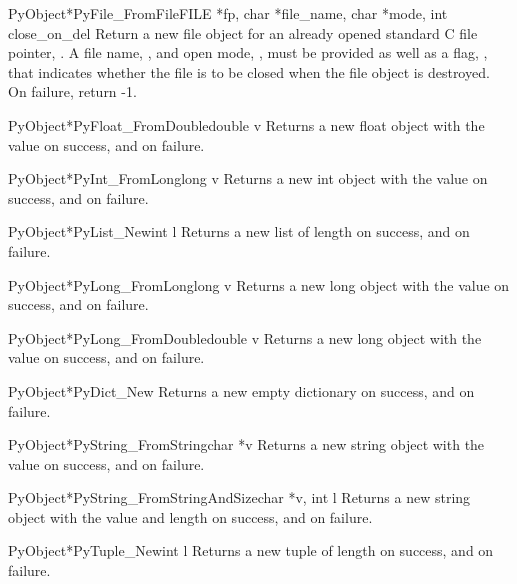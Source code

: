      \begin{cfuncdesc}{PyObject*}{PyFile_FromFile}{FILE *fp, char *file_name, char *mode, int close_on_del}
	 Return a new file object for an already opened standard C
	 file pointer, .  A file name, , and open mode,
	 , must be provided as well as a flag, , that
	 indicates whether the file is to be closed when the file
	 object is destroyed.  On failure, return -1.
     \end{cfuncdesc}

     \begin{cfuncdesc}{PyObject*}{PyFloat_FromDouble}{double v}
	 Returns a new float object with the value  on success, and
	 {\NULL} on failure.
     \end{cfuncdesc}
     
     \begin{cfuncdesc}{PyObject*}{PyInt_FromLong}{long v}
	 Returns a new int object with the value  on success, and
	 {\NULL} on failure.
     \end{cfuncdesc}

     \begin{cfuncdesc}{PyObject*}{PyList_New}{int l}
	 Returns a new list of length  on success, and {\NULL} on
	 failure.
     \end{cfuncdesc}

     \begin{cfuncdesc}{PyObject*}{PyLong_FromLong}{long v}
	 Returns a new long object with the value  on success, and
	 {\NULL} on failure.
     \end{cfuncdesc}

     \begin{cfuncdesc}{PyObject*}{PyLong_FromDouble}{double v}
	 Returns a new long object with the value  on success, and
	 {\NULL} on failure.
     \end{cfuncdesc}

     \begin{cfuncdesc}{PyObject*}{PyDict_New}{}
	 Returns a new empty dictionary on success, and {\NULL} on
	 failure.
     \end{cfuncdesc}

     \begin{cfuncdesc}{PyObject*}{PyString_FromString}{char *v}
	 Returns a new string object with the value  on success, and
	 {\NULL} on failure.
     \end{cfuncdesc}

     \begin{cfuncdesc}{PyObject*}{PyString_FromStringAndSize}{char *v, int l}
	 Returns a new string object with the value  and length 
	 on success, and {\NULL} on failure.
     \end{cfuncdesc}

     \begin{cfuncdesc}{PyObject*}{PyTuple_New}{int l}
	 Returns a new tuple of length  on success, and {\NULL} on
	 failure.
     \end{cfuncdesc}

